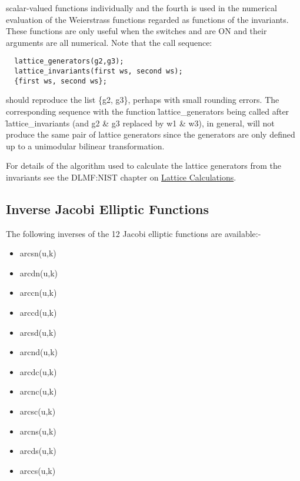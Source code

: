 scalar-valued functions individually and the fourth is used in the numerical
evaluation of the Weierstrass functions regarded as functions of the
invariants. These functions are only useful when the switches  and
 are ON and their arguments are all numerical.
Note that the call sequence:
\begin{verbatim}
  lattice_generators(g2,g3);
  lattice_invariants(first ws, second ws);
  {first ws, second ws};
\end{verbatim}
should reproduce the list \{g2, g3\}, perhaps with small rounding errors. The
corresponding sequence with the function \f{lattice\_generators} being called after
\f{lattice\_invariants} (and g2 \& g3 replaced by w1 \& w3),
in general, will not produce the same pair of lattice generators since the
generators are only defined up to a unimodular bilinear transformation.

For details of the algorithm used to calculate the lattice generators from the
invariants see the DLMF:NIST chapter on
\href{https://dlmf.nist.gov/23.22#ii}{Lattice Calculations}.

\subsection{Inverse Jacobi Elliptic Functions}
The following inverses of the 12 Jacobi elliptic functions are available:-
\hypertarget{INVELL}{}
\hypertarget{operator:ARCSN}{}
\hypertarget{operator:ARCCN}{}
\hypertarget{operator:ARCDN}{}
\hypertarget{operator:ARCCD}{}
\hypertarget{operator:ARCSD}{}
\hypertarget{operator:ARCND}{}
\hypertarget{operator:ARCDC}{}
\hypertarget{operator:ARCNC}{}
\hypertarget{operator:ARCSC}{}
\hypertarget{operator:ARCNS}{}
\hypertarget{operator:ARCDS}{}
\hypertarget{operator:ARCCS}{}
\begin{itemize}
\item arcsn(u,k)
\item arcdn(u,k)
\item arccn(u,k)
\item arccd(u,k)
\item arcsd(u,k)
\item arcnd(u,k)
\item arcdc(u,k)
\item arcnc(u,k)
\item arcsc(u,k)
\item arcns(u,k)
\item arcds(u,k)
\item arccs(u,k)
\end{itemize}

